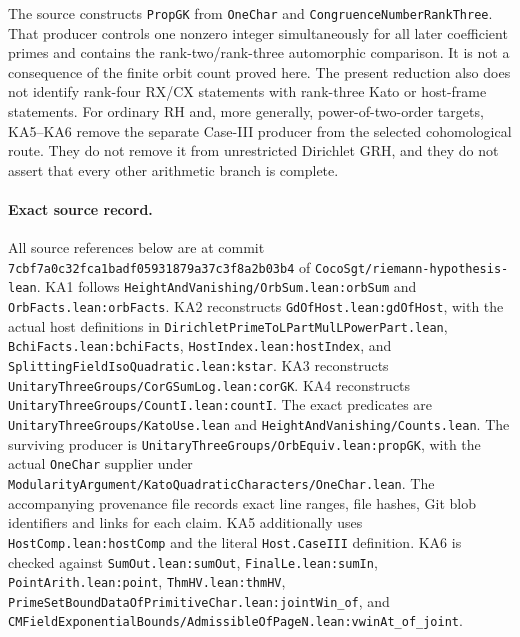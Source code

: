 The source constructs \texttt{PropGK} from \texttt{OneChar} and
\texttt{CongruenceNumberRankThree}.  That producer controls one
nonzero integer simultaneously for all later coefficient primes
and contains the rank-two/rank-three automorphic comparison.
It is not a consequence of the finite orbit count proved here.
The present reduction also does not identify rank-four RX/CX
statements with rank-three Kato or host-frame statements.
For ordinary RH and, more generally, power-of-two-order targets,
KA5--KA6 remove the separate Case-III producer from the selected
cohomological route.  They do not remove it from unrestricted
Dirichlet GRH, and they do not assert that every other arithmetic
branch is complete.

\paragraph{Exact source record.}
All source references below are at commit
\texttt{7cbf7a0c32fca1badf05931879a37c3f8a2b03b4} of
\texttt{CocoSgt/riemann-hypothesis-lean}.  KA1 follows
\texttt{HeightAndVanishing/OrbSum.lean:orbSum} and
\texttt{OrbFacts.lean:orbFacts}.  KA2 reconstructs
\texttt{GdOfHost.lean:gdOfHost}, with the actual host definitions
in \texttt{DirichletPrimeToLPartMulLPowerPart.lean},
\texttt{BchiFacts.lean:bchiFacts},
\texttt{HostIndex.lean:hostIndex}, and
\texttt{SplittingFieldIsoQuadratic.lean:kstar}.
KA3 reconstructs \texttt{UnitaryThreeGroups/CorGSumLog.lean:corGK}.
KA4 reconstructs \texttt{UnitaryThreeGroups/CountI.lean:countI}.
The exact predicates are \texttt{UnitaryThreeGroups/KatoUse.lean}
and \texttt{HeightAndVanishing/Counts.lean}.
The surviving producer is
\texttt{UnitaryThreeGroups/OrbEquiv.lean:propGK}, with the
actual \texttt{OneChar} supplier under
\texttt{ModularityArgument/KatoQuadraticCharacters/OneChar.lean}.
The accompanying provenance file records exact line ranges,
file hashes, Git blob identifiers and links for each claim.
KA5 additionally uses \texttt{HostComp.lean:hostComp} and the
literal \texttt{Host.CaseIII} definition.  KA6 is checked against
\texttt{SumOut.lean:sumOut}, \texttt{FinalLe.lean:sumIn},
\texttt{PointArith.lean:point}, \texttt{ThmHV.lean:thmHV},
\texttt{PrimeSetBoundDataOfPrimitiveChar.lean:jointWin\_of}, and
\texttt{CMFieldExponentialBounds/AdmissibleOfPageN.lean:vwinAt\_of\_joint}.
